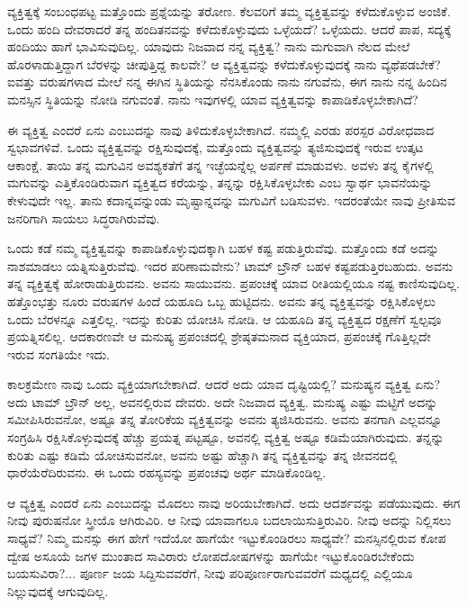 ವ್ಯಕ್ತಿತ್ವಕ್ಕೆ ಸಂಬಂಧಪಟ್ಟ ಮತ್ತೊಂದು ಪ್ರಶ್ನೆಯನ್ನು ತರೋಣ. ಕೆಲವರಿಗೆ ತಮ್ಮ ವ್ಯಕ್ತಿತ್ವವನ್ನು ಕಳೆದುಕೊಳ್ಳುವ ಅಂಜಿಕೆ. ಒಂದು ಹಂದಿ ದೇವರಾದರೆ ತನ್ನ ಹಂದಿತನವನ್ನು ಕಳೆದುಕೊಳ್ಳುವುದು ಒಳ್ಳೆಯದೆ? ಒಳ್ಳೆಯದು. ಆದರೆ ಪಾಪ, ಸದ್ಯಕ್ಕೆ ಹಂದಿಯು ಹಾಗೆ ಭಾವಿಸುವುದಿಲ್ಲ. ಯಾವುದು ನಿಜವಾದ ನನ್ನ ವ್ಯಕ್ತಿತ್ವ? ನಾನು ಮಗುವಾಗಿ ನೆಲದ ಮೇಲೆ ಹೊರಳಾಡುತ್ತಿದ್ದಾಗ ಬೆರಳನ್ನು ಚೀಪುತ್ತಿದ್ದ ಕಾಲವೇ? ಆ ವ್ಯಕ್ತಿತ್ವವನ್ನು ಕಳೆದುಕೊಳ್ಳುವುದಕ್ಕೆ ನಾನು ವ್ಯಥೆಪಡಬೇಕೆ? ಐವತ್ತು ವರುಷಗಳಾದ ಮೇಲೆ ನನ್ನ ಈಗಿನ ಸ್ಥಿತಿಯನ್ನು ನೆನಸಿಕೊಂಡು ನಾನು ನಗುವೆನು, ಈಗ ನಾನು ನನ್ನ ಹಿಂದಿನ ಮನಸ್ಸಿನ ಸ್ಥಿತಿಯನ್ನು ನೋಡಿ ನಗುವಂತೆ. ನಾನು ಇವುಗಳಲ್ಲಿ ಯಾವ ವ್ಯಕ್ತಿತ್ವವನ್ನು ಕಾಪಾಡಿಕೊಳ್ಳಬೇಕಾಗಿದೆ?

ಈ ವ್ಯಕ್ತಿತ್ವ ಎಂದರೆ ಏನು ಎಂಬುದನ್ನು ನಾವು ತಿಳಿದುಕೊಳ್ಳಬೇಕಾಗಿದೆ. ನಮ್ಮಲ್ಲಿ ಎರಡು ಪರಸ್ಪರ ವಿರೋಧವಾದ ಸ್ವಭಾವಗಳಿವೆ. ಒಂದು ವ್ಯಕ್ತಿತ್ವವನ್ನು ರಕ್ಷಿಸುವುದಕ್ಕೆ, ಮತ್ತೊಂದು ವ್ಯಕ್ತಿತ್ವವನ್ನು ತ್ಯಜಿಸುವುದಕ್ಕೆ ಇರುವ ಉತ್ಕಟ ಆಕಾಂಕ್ಷೆ. ತಾಯಿ ತನ್ನ ಮಗುವಿನ ಅವಶ್ಯಕತೆಗೆ ತನ್ನ ಇಚ್ಛೆಯನ್ನೆಲ್ಲ ಅರ್ಪಣೆ ಮಾಡುವಳು. ಅವಳು ತನ್ನ ಕೈಗಳಲ್ಲಿ ಮಗುವನ್ನು ಎತ್ತಿಕೊಂಡಿರುವಾಗ ವ್ಯಕ್ತಿತ್ವದ ಕರೆಯನ್ನು, ತನ್ನನ್ನು ರಕ್ಷಿಸಿಕೊಳ್ಳಬೇಕು ಎಂಬ ಸ್ವಾರ್ಥ ಭಾವನೆಯನ್ನು ಕೇಳುವುದೇ ಇಲ್ಲ. ತಾನು ಕದಾನ್ನವನ್ನುಂಡು ಮೃಷ್ಟಾನ್ನವನ್ನು ಮಗುವಿಗೆ ಬಡಿಸುವಳು. ಇದರಂತೆಯೇ ನಾವು ಪ್ರೀತಿಸುವ ಜನರಿಗಾಗಿ ಸಾಯಲು ಸಿದ್ಧರಾಗಿರುವೆವು.

ಒಂದು ಕಡೆ ನಮ್ಮ ವ್ಯಕ್ತಿತ್ವವನ್ನು ಕಾಪಾಡಿಕೊಳ್ಳುವುದಕ್ಕಾಗಿ ಬಹಳ ಕಷ್ಟ ಪಡುತ್ತಿರುವೆವು. ಮತ್ತೊಂದು ಕಡೆ ಅದನ್ನು ನಾಶಮಾಡಲು ಯತ್ನಿಸುತ್ತಿರುವೆವು. ಇದರ ಪರಿಣಾಮವೇನು? ಟಾಮ್ ಬ್ರೌನ್ ಬಹಳ ಕಷ್ಟಪಡುತ್ತಿರಬಹುದು. ಅವನು ತನ್ನ ವ್ಯಕ್ತಿತ್ವಕ್ಕೆ ಹೋರಾಡುತ್ತಿರುವನು. ಅವನು ಸಾಯುವನು. ಪ್ರಪಂಚಕ್ಕೆ ಯಾವ ರೀತಿಯಲ್ಲಿಯೂ ನಷ್ಟ ಕಾಣಿಸುವುದಿಲ್ಲ. ಹತ್ತೊಂಭತ್ತು ನೂರು ವರುಷಗಳ ಹಿಂದೆ ಯಹೂದಿ ಒಬ್ಬ ಹುಟ್ಟಿದನು. ಅವನು ತನ್ನ ವ್ಯಕ್ತಿತ್ವವನ್ನು ರಕ್ಷಿಸಿಕೊಳ್ಳಲು ಒಂದು ಬೆರಳನ್ನೂ ಎತ್ತಲಿಲ್ಲ. ಇದನ್ನು ಕುರಿತು ಯೋಚಿಸಿ ನೋಡಿ. ಆ ಯಹೂದಿ ತನ್ನ ವ್ಯಕ್ತಿತ್ವದ ರಕ್ಷಣೆಗೆ ಸ್ವಲ್ಪವೂ ಪ್ರಯತ್ನಿಸಲಿಲ್ಲ. ಆದಕಾರಣವೇ ಆ ಮನುಷ್ಯ ಪ್ರಪಂಚದಲ್ಲಿ ಶ್ರೇಷ್ಠತಮನಾದ ವ್ಯಕ್ತಿಯಾದ, ಪ್ರಪಂಚಕ್ಕೆ ಗೊತ್ತಿಲ್ಲದೇ ಇರುವ ಸಂಗತಿಯೇ ಇದು.

ಕಾಲಕ್ರಮೇಣ ನಾವು ಒಂದು ವ್ಯಕ್ತಿಯಾಗಬೇಕಾಗಿದೆ. ಆದರೆ ಅದು ಯಾವ ದೃಷ್ಟಿಯಲ್ಲಿ? ಮನುಷ್ಯನ ವ್ಯಕ್ತಿತ್ವ ಏನು? ಅದು ಟಾಮ್ ಬ್ರೌನ್ ಅಲ್ಲ, ಅವನಲ್ಲಿರುವ ದೇವರು. ಅದೇ ನಿಜವಾದ ವ್ಯಕ್ತಿತ್ವ. ಮನುಷ್ಯ ಎಷ್ಟು ಮಟ್ಟಿಗೆ ಅದನ್ನು ಸಮೀಪಿಸಿರುವನೋ, ಅಷ್ಟೂ ತನ್ನ ತೋರಿಕೆಯ ವ್ಯಕ್ತಿತ್ವವನ್ನು ಅವನು ತ್ಯಜಿಸಿರುವನು. ಅವನು ತನಗಾಗಿ ಎಲ್ಲವನ್ನೂ ಸಂಗ್ರಹಿಸಿ ರಕ್ಷಿಸಿಕೊಳ್ಳುವುದಕ್ಕೆ ಹೆಚ್ಚು ಪ್ರಯತ್ನ ಪಟ್ಟಷ್ಟೂ, ಅವನಲ್ಲಿ ವ್ಯಕ್ತಿತ್ವ ಅಷ್ಟೂ ಕಡಿಮೆಯಾಗಿರುವುದು. ತನ್ನನ್ನು ಕುರಿತು ಎಷ್ಟು ಕಡಿಮೆ ಯೋಚಿಸುವನೋ, ಅವನು ಅಷ್ಟು ಹೆಚ್ಚಾಗಿ ತನ್ನ ವ್ಯಕ್ತಿತ್ವವನ್ನು ತನ್ನ ಜೀವನದಲ್ಲಿ ಧಾರೆಯೆರೆದಿರುವನು. ಈ ಒಂದು ರಹಸ್ಯವನ್ನು ಪ್ರಪಂಚವು ಅರ್ಥ ಮಾಡಿಕೊಂಡಿಲ್ಲ.

ಆ ವ್ಯಕ್ತಿತ್ವ ಎಂದರೆ ಏನು ಎಂಬುದನ್ನು ಮೊದಲು ನಾವು ಅರಿಯಬೇಕಾಗಿದೆ. ಅದು ಆದರ್ಶವನ್ನು ಪಡೆಯುವುದು. ಈಗ ನೀವು ಪುರುಷನೋ ಸ್ತ್ರೀಯೊ ಆಗಿರುವಿರಿ. ಆ ನೀವು ಯಾವಾಗಲೂ ಬದಲಾಯಿಸುತ್ತಿರುವಿರಿ. ನೀವು ಅದನ್ನು ನಿಲ್ಲಿಸಲು ಸಾಧ್ಯವೆ? ನಿಮ್ಮ ಮನಸ್ಸು ಈಗ ಹೇಗೆ ಇದೆಯೋ ಹಾಗೆಯೇ ಇಟ್ಟುಕೊಂಡಿರಲು ಸಾಧ್ಯವೇ? ಮನಸ್ಸಿನಲ್ಲಿರುವ ಕೋಪ ದ್ವೇಷ ಅಸೂಯೆ ಜಗಳ ಮುಂತಾದ ಸಾವಿರಾರು ಲೋಪದೋಷಗಳನ್ನು ಹಾಗೆಯೇ ಇಟ್ಟುಕೊಂಡಿರಬೇಕೆಂದು ಬಯಸುವಿರಾ?... ಪೂರ್ಣ ಜಯ ಸಿದ್ದಿಸುವವರೆಗೆ, ನೀವು ಪರಿಪೂರ್ಣರಾಗುವವರೆಗೆ ಮಧ್ಯದಲ್ಲಿ ಎಲ್ಲಿಯೂ ನಿಲ್ಲುವುದಕ್ಕೆ ಆಗುವುದಿಲ್ಲ.

